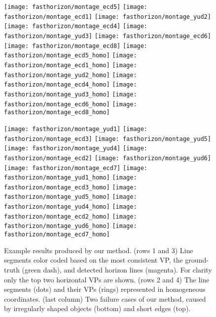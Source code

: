 \begin{figure*}
  \centering
  \texttt{[image: fasthorizon/montage\_ecd5]}
  \texttt{[image: fasthorizon/montage\_ecd1]}
  \texttt{[image: fasthorizon/montage\_yud2]}
  \texttt{[image: fasthorizon/montage\_ecd4]}
  \texttt{[image: fasthorizon/montage\_yud3]}
  \texttt{[image: fasthorizon/montage\_ecd6]}
  \texttt{[image: fasthorizon/montage\_ecd8]}
  \texttt{[image: fasthorizon/montage\_ecd5\_homo]}
  \texttt{[image: fasthorizon/montage\_ecd1\_homo]}
  \texttt{[image: fasthorizon/montage\_yud2\_homo]}
  \texttt{[image: fasthorizon/montage\_ecd4\_homo]}
  \texttt{[image: fasthorizon/montage\_yud3\_homo]}
  \texttt{[image: fasthorizon/montage\_ecd6\_homo]}
  \texttt{[image: fasthorizon/montage\_ecd8\_homo]}
  
  \texttt{[image: fasthorizon/montage\_yud1]}
  \texttt{[image: fasthorizon/montage\_ecd3]}
  \texttt{[image: fasthorizon/montage\_yud5]}
  \texttt{[image: fasthorizon/montage\_yud4]}
  \texttt{[image: fasthorizon/montage\_ecd2]}
  \texttt{[image: fasthorizon/montage\_yud6]}
  \texttt{[image: fasthorizon/montage\_ecd7]}
  \texttt{[image: fasthorizon/montage\_yud1\_homo]}
  \texttt{[image: fasthorizon/montage\_ecd3\_homo]}
  \texttt{[image: fasthorizon/montage\_yud5\_homo]}
  \texttt{[image: fasthorizon/montage\_yud4\_homo]}
  \texttt{[image: fasthorizon/montage\_ecd2\_homo]}
  \texttt{[image: fasthorizon/montage\_yud6\_homo]}
  \texttt{[image: fasthorizon/montage\_ecd7\_homo]}
  \caption{Example results produced by our method.  (rows 1 and 3)
    Line segments color coded based on the most consistent VP, the
    ground-truth (green dash), and detected horizon lines (magenta).
    For clarity only the top two horizontal VPs are shown.  (rows 2
    and 4) The line segments (dots) and their VPs (rings) represented
    in homogeneous coordinates. (last column) Two failure cases of our
    method, caused by irregularly shaped objects (bottom) and short
    edges (top).}
  \label{fig:examples}
\end{figure*}

